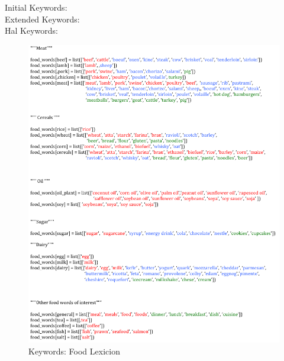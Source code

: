 \documentclass[12pt]{report}
\begin{document}
 \color{red} Initial Keywords: \\
 \color{blue}Extended Keywords:  \\
\color{green}Hal Keywords:  \\


 \begin{figure}[H]
\centerline{ \noindent\includegraphics[width=1\textwidth]{img/abs/hyrach_lex}}
 \caption{Keywords: Food Lexicion}
 \label{fig:flex}
\end{figure}
\end{document}
